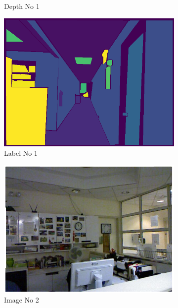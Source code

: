 \documentclass[a4paper, openany]{book}
\begin{document}
\begin{figure}[ht]
\begin{subfigure}[b]{0.3\linewidth}
    \caption{Depth No 1}
  \end{subfigure}
    \begin{subfigure}[b]{0.3\linewidth}
    \includegraphics[width=\linewidth]{images/labelNo14.png}
    \caption{Label No 1}
  \end{subfigure}
  \begin{subfigure}[b]{0.3\linewidth}
    \includegraphics[width=\linewidth]{images/imgNo12.png}
    \caption{Image No 2}
  \end{subfigure}
  \begin{subfigure}[b]{0.3\linewidth}

\end{subfigure}
\end{figure}
\end{document}

